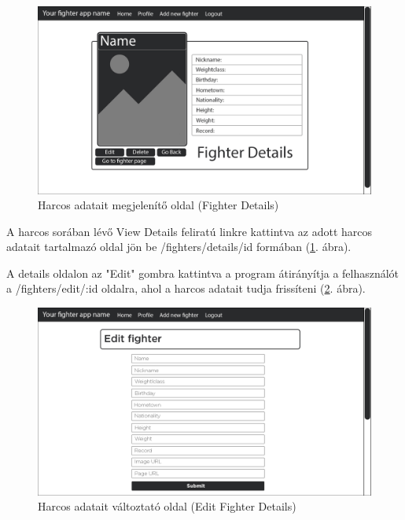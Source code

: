 \begin{figure}[htb]
\centering
\includegraphics[scale=0.7]{kepek/details.jpg}
\caption{Harcos adatait megjelenítő oldal (Fighter Details)}
\label{fig:details}
\end{figure}

A harcos sorában lévő View Details feliratú linkre kattintva az adott harcos adatait tartalmazó oldal jön be /fighters/details/id formában (\ref{fig:details}. ábra).

A details oldalon az "Edit" gombra kattintva a program átirányítja a felhasználót a /fighters/edit/:id oldalra, ahol a harcos adatait tudja frissíteni (\ref{fig:edit}. ábra).

\begin{figure}[htb]
\centering
\includegraphics[scale=0.7]{kepek/edit_fighter.jpg}
\caption{Harcos adatait változtató oldal (Edit Fighter Details)}
\label{fig:edit}
\end{figure}

